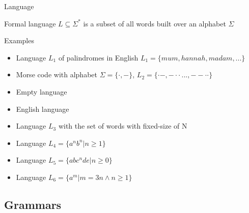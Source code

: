 \documentclass{beamer}
\begin{document}
\begin{frame}{Language}
	
\begin{definition}{Formal language}
$L\subseteq\Sigma^{\ast}$ is a subset of all words built over an alphabet $\Sigma$
\end{definition}
	
\begin{exampleblock}{Examples}
\begin{itemize}
\item Language $L_1$ of palindromes in English $L_1 = \{mum, hannah, madam,...\}$
\item Morse code with alphabet $\Sigma=\{\cdot,	 -\}$, $L_2=\{\cdot -, - \cdot \cdot\,...,--\cdot\cdot\}$
\item Empty language
\item English language
\item Language $L_3$ with the set of words with fixed-size of N
\item Language $L_4 = \{a^nb^n | n \geq 1\}$
\item Language $L_5 = \{abc^nde | n \geq 0\}$
\item Language $L_6 = \{a^m | m = 3n \land n \geq 1\}$
\end{itemize}
\end{exampleblock}
\end{frame}

\subsection{Grammars}

\end{document}
